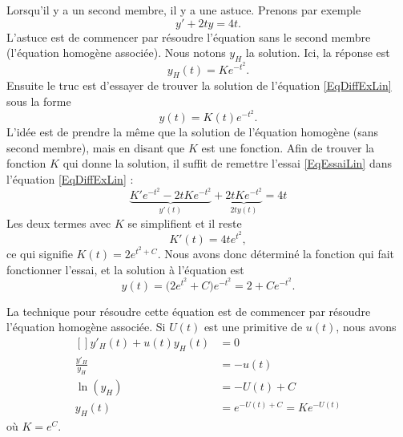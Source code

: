 \begin{example}

	Lorsqu'il y a un second membre, il y a une astuce. Prenons par exemple
	\begin{equation}		\label{EqDiffExLin}
		y'+2ty=4t.
	\end{equation}
	L'astuce est de commencer par résoudre l'équation sans le second membre (l'équation homogène associée). Nous notons \( y_H\) la solution. Ici, la réponse est
	\begin{equation}
		y_H(t)=K e^{-t^2}.
	\end{equation}
	Ensuite le truc est d'essayer de trouver la solution de l'équation \eqref{EqDiffExLin} sous la forme
	\begin{equation}		\label{EqEssaiLin}
		y(t)=K(t) e^{-t^2}.
	\end{equation}
	L'idée est de prendre la même que la solution de l'équation homogène (sans second membre), mais en disant que \( K\) est une fonction. Afin de trouver la fonction \( K\) qui donne la solution, il suffit de remettre l'essai \eqref{EqEssaiLin} dans l'équation \eqref{EqDiffExLin} :
	\begin{equation}
		\underbrace{K' e^{-t^2}-2tK e^{-t^2}}_{y'(t)}+\underbrace{2tK e^{-t^2}}_{2ty(t)}=4t
	\end{equation}
	Les deux termes avec \( K\) se simplifient et il reste
	\begin{equation}
		K'(t)=4t e^{t^2},
	\end{equation}
	ce qui signifie \( K(t)=2 e^{t^2+C}\). Nous avons donc déterminé la fonction qui fait fonctionner l'essai, et la solution à l'équation est
	\begin{equation}
		y(t)=\big( 2 e^{t^2}+C \big) e^{-t^2}=2+C e^{-t^2}.
	\end{equation}
\end{example}

La technique pour résoudre cette équation est de commencer par résoudre l'équation homogène associée. Si \( U(t)\) est une primitive de \( u(t)\), nous avons
\begin{equation}
	\begin{aligned}[]
		y'_H(t)+u(t)y_H(t)   & =0                        \\
		\frac{ y'_H }{ y_H } & =-u(t)                    \\
		\ln(y_H)             & =-U(t)+C                  \\
		y_H(t)               & = e^{-U(t)+C}=K e^{-U(t)}
	\end{aligned}
\end{equation}
où \( K= e^{C}\).

